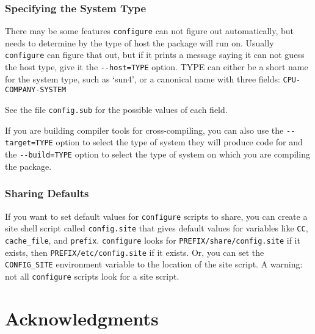 \begin{appendix}
\subsection*{Specifying the System Type}


   There may be some features \verb+configure+ can not figure out
automatically, but needs to determine by the type of host the package
will run on.  Usually \verb+configure+ can figure that out, but if it prints
a message saying it can not guess the host type, give it the
\verb+--host=TYPE+ option.  TYPE can either be a short name for the system
type, such as `sun4', or a canonical name with three fields: 
\verb+CPU-COMPANY-SYSTEM+

See the file \verb+config.sub+ for the possible values of each field. 
 
   If you are building compiler tools for cross-compiling, you can also
use the \verb+--target=TYPE+ option to select the type of system they will
produce code for and the \verb+--build=TYPE+ option to select the type of
system on which you are compiling the package.

\subsection*{Sharing Defaults}
   If you want to set default values for \verb+configure+ scripts to share,
you can create a site shell script called \verb+config.site+ that gives
default values for variables like \verb+CC+,  \verb+cache_file+, and 
\verb+prefix+.
\verb+configure+ looks for \verb+PREFIX/share/config.site+ if it exists, then
\verb+PREFIX/etc/config.site+ if it exists.  Or, you can set the
\verb+CONFIG_SITE+ environment variable to the location of the site script.
A warning: not all \verb+configure+ scripts look for a site script.








\chapter*{Acknowledgments}

\end{appendix}

